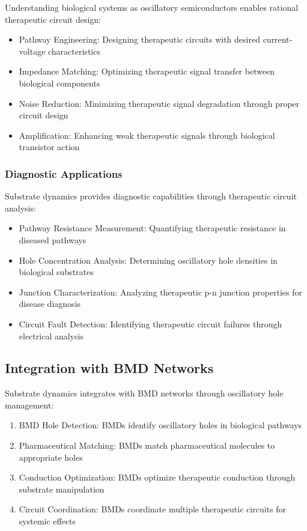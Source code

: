 \documentclass[12pt,a4paper]{article}
\begin{document}
Understanding biological systems as oscillatory semiconductors enables rational therapeutic circuit design:

\begin{itemize}
\item Pathway Engineering: Designing therapeutic circuits with desired current-voltage characteristics
\item Impedance Matching: Optimizing therapeutic signal transfer between biological components
\item Noise Reduction: Minimizing therapeutic signal degradation through proper circuit design
\item Amplification: Enhancing weak therapeutic signals through biological transistor action
\end{itemize}

\subsubsection{Diagnostic Applications}

Substrate dynamics provides diagnostic capabilities through therapeutic circuit analysis:

\begin{itemize}
\item Pathway Resistance Measurement: Quantifying therapeutic resistance in diseased pathways
\item Hole Concentration Analysis: Determining oscillatory hole densities in biological substrates
\item Junction Characterization: Analyzing therapeutic p-n junction properties for disease diagnosis
\item Circuit Fault Detection: Identifying therapeutic circuit failures through electrical analysis
\end{itemize}

\subsection{Integration with BMD Networks}

Substrate dynamics integrates with BMD networks through oscillatory hole management:

\begin{enumerate}
\item BMD Hole Detection: BMDs identify oscillatory holes in biological pathways
\item Pharmaceutical Matching: BMDs match pharmaceutical molecules to appropriate holes
\item Conduction Optimization: BMDs optimize therapeutic conduction through substrate manipulation
\item Circuit Coordination: BMDs coordinate multiple therapeutic circuits for systemic effects
\end{enumerate}
\end{document}
